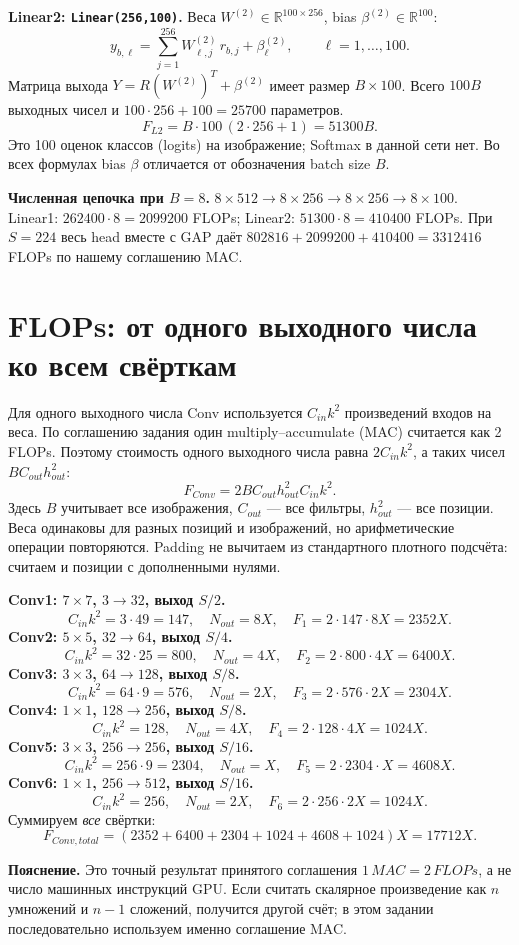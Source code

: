 \documentclass[11pt,a4paper]{article}
\newcommand{\page}[1]{\clearpage\section{#1}}
\newcommand{\note}[1]{\par\textbf{Пояснение.} #1\par}
\begin{document}
\textbf{Linear2: \texttt{Linear(256,100)}.} Веса
$W^{(2)}\in\mathbb R^{100\times256}$, bias $\beta^{(2)}\in\mathbb R^{100}$:
\[
 y_{b,\ell}=\sum_{j=1}^{256}W^{(2)}_{\ell,j}\,r_{b,j}+\beta^{(2)}_\ell,
 \qquad \ell=1,\ldots,100.
\]
Матрица выхода $Y=R(W^{(2)})^T+\beta^{(2)}$ имеет размер $B\times100$.
Всего $100B$ выходных чисел и $100\cdot256+100=25700$ параметров.
\[
 F_{L2}=B\cdot100\,(2\cdot256+1)=51300B.
\]
Это 100 оценок классов (logits) на изображение; Softmax в данной сети нет.
Во всех формулах bias $\beta$ отличается от обозначения batch size $B$.

\textbf{Численная цепочка при $B=8$.}
$8\times512\to8\times256\to8\times256\to8\times100$.
Linear1: $262400\cdot8=2099200$ FLOPs; Linear2:
$51300\cdot8=410400$ FLOPs. При $S=224$ весь head вместе с GAP даёт
$802816+2099200+410400=3312416$ FLOPs по нашему соглашению MAC.

\page{FLOPs: от одного выходного числа ко всем свёрткам}
Для одного выходного числа Conv используется $C_{in}k^2$ произведений
входов на веса. По соглашению задания один multiply--accumulate (MAC)
считается как 2 FLOPs. Поэтому стоимость одного выходного числа равна
$2C_{in}k^2$, а таких чисел $BC_{out}h_{out}^2$:
\[
\boxed{F_{Conv}=2BC_{out}h_{out}^2C_{in}k^2.}
\]
Здесь $B$ учитывает все изображения, $C_{out}$ --- все фильтры,
$h_{out}^2$ --- все позиции. Веса одинаковы для разных позиций и изображений,
но арифметические операции повторяются. Padding не вычитаем из стандартного
плотного подсчёта: считаем и позиции с дополненными нулями.

\textbf{Conv1: $7\times7$, $3\to32$, выход $S/2$.}
\[
 C_{in}k^2=3\cdot49=147,\quad N_{out}=8X,
 \quad F_1=2\cdot147\cdot8X=2352X.
\]
\textbf{Conv2: $5\times5$, $32\to64$, выход $S/4$.}
\[
 C_{in}k^2=32\cdot25=800,\quad N_{out}=4X,
 \quad F_2=2\cdot800\cdot4X=6400X.
\]
\textbf{Conv3: $3\times3$, $64\to128$, выход $S/8$.}
\[
 C_{in}k^2=64\cdot9=576,\quad N_{out}=2X,
 \quad F_3=2\cdot576\cdot2X=2304X.
\]
\textbf{Conv4: $1\times1$, $128\to256$, выход $S/8$.}
\[
 C_{in}k^2=128,\quad N_{out}=4X,
 \quad F_4=2\cdot128\cdot4X=1024X.
\]
\textbf{Conv5: $3\times3$, $256\to256$, выход $S/16$.}
\[
 C_{in}k^2=256\cdot9=2304,\quad N_{out}=X,
 \quad F_5=2\cdot2304\cdot X=4608X.
\]
\textbf{Conv6: $1\times1$, $256\to512$, выход $S/16$.}
\[
 C_{in}k^2=256,\quad N_{out}=2X,
 \quad F_6=2\cdot256\cdot2X=1024X.
\]
Суммируем \emph{все} свёртки:
\[
\boxed{F_{Conv,total}=(2352+6400+2304+1024+4608+1024)X=17712X.}
\]

\note{Это точный результат принятого соглашения $1\,MAC=2\,FLOPs$,
а не число машинных инструкций GPU. Если считать скалярное произведение как
$n$ умножений и $n-1$ сложений, получится другой счёт; в этом задании
последовательно используем именно соглашение MAC.}
\end{document}

